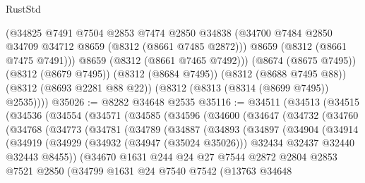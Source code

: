 \begin{lexlean}{RustStd}
\begin{coremodule}
          (@34825
            @7491
            @7504
            @2853
            @7474
            @2850
            @34838
            (@34700 @7484 @2850 @34709 @34712 @8659 (@8312 (@8661 @7485 @2872)))
            @8659
            (@8312 (@8661 @7475 @7491)))
          @8659
          (@8312 (@8661 @7465 @7492)))
        (@8674 (@8675 @7495))
        (@8312 (@8679 @7495))
        (@8312 (@8684 @7495))
        (@8312 (@8688 @7495 @88))
        (@8312 (@8693 @2281 @88 @22))
        (@8312 (@8313 (@8314 (@8699 @7495)) @2535))))
@35026 := @8282 @34648 @2535
@35116 := @34511
    (@34513
      (@34515
        (@34536
          (@34554
            (@34571
              (@34585
                (@34596
                  (@34600
                    (@34647
                      (@34732
                        (@34760
                          (@34768
                            (@34773
                              (@34781
                                (@34789
                                  (@34887
                                    (@34893
                                      (@34897
                                        (@34904
                                          (@34914
                                            (@34919
                                              (@34929
                                                (@34932 (@34947 (@35024 @35026)))
                                                @32434
                                                @32437
                                                @32440
                                                @32443
                                                @8455))
                                            (@34670
                                              @1631
                                              @244
                                              @24
                                              @27
                                              @7544
                                              @2872
                                              @2804
                                              @2853
                                              @7521
                                              @2850
                                              (@34799
                                                @1631
                                                @24
                                                @7540
                                                @7542
                                                (@13763
                                                  @34648

\end{coremodule}
\end{lexlean}
